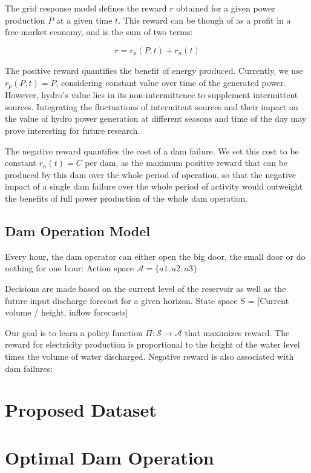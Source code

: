 \documentclass{article}
\begin{document}
The grid response model defines the reward $r$ obtained for a given power production $P$ at a given time $t$.
This reward can be though of as a profit in a free-market economy, and is the sum of two terms:

$$ r = r_p(P, t) + r_n(t)$$

The positive reward quantifies the benefit of energy produced.
Currently, we use $r_p(P, t)=P$, considering constant value over time of the generated power.
However, hydro's value lies in its non-intermittence to supplement intermittent sources.
Integrating the fluctuations of intermitent sources and their impact on the value of hydro power generation 
at different seasons and time of the day may prove interesting for future research.

The negative reward quantifies the cost of a dam failure.
We set this cost to be constant $r_n(t)=C$ per dam,
as the maximum positive reward that can be produced by this dam over the whole period of operation,
so that the negative impact of a single dam failure over the whole period of activity 
would outweight the benefits of full power production of the whole dam operation.

\subsection{Dam Operation Model}
\label{sec: Dam Operation Model}

Every hour, the dam operator can either open the big door, the small door or do nothing for one hour: 
Action space $ \mathcal{A} = \{a1, a2, a3 \}$

Decisions are made based on the current level of the reservoir as well as the future input discharge forecast for a given horizon.
State space S = [Current volume / height, inflow forecasts]

Our goal is to learn a policy function $\Pi: \mathcal{S} \rightarrow \mathcal{A}$ that maximizes reward.
The reward for electricity production is proportional to the height of the water level times the volume of water discharged. Negative reward is also associated with dam failures:


\section{Proposed Dataset}
\label{sec:Proposed Dataset}


\section{Optimal Dam Operation}
\label{sec:Hydrological Uncertainty}
\end{document}
